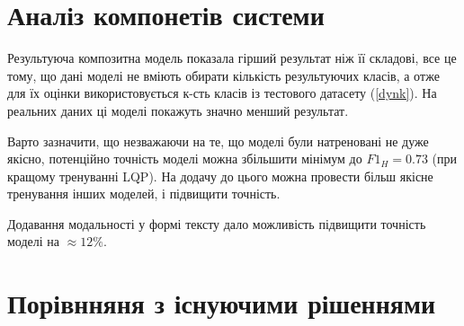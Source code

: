 \documentclass{udstu}
\begin{document}
\section{Аналіз компонетів системи}

\begin{center}
\end{center}

Результуюча композитна модель показала гірший результат ніж її складові, все це тому, що дані моделі
не вміють обирати кількість результуючих класів, а отже для їх оцінки використовується
к-сть класів із тестового датасету (\ref{dynk}). На реальних даних ці моделі покажуть значно
менший результат.

Варто зазначити, що незважаючи на те, що моделі були натреновані не дуже якісно,
потенційно точність моделі можна збільшити мінімум до $F1_H = 0.73$ (при кращому тренуванні LQP).
На додачу до цього можна провести більш якісне тренування інших моделей, і підвищити точність.

Додавання модальності у формі тексту дало можливість підвищити точність моделі на $\approx 12\%$.


\section{Порівнняня з існуючими рішеннями}
\end{document}
